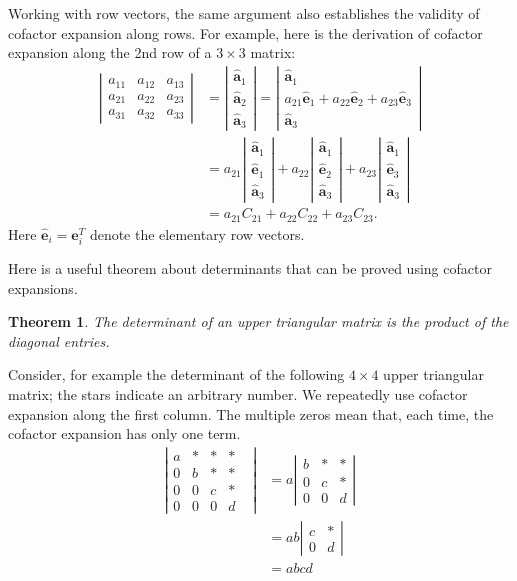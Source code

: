 \documentclass[12pt]{article}
\newcommand{\ha}{\hat{\ba}}
\newcommand{\ba}{\mathbf{a}}
\newcommand{\be}{\mathbf{e}}
\newcommand{\he}{\hat{\be}}
\newcommand{\vmat}[1]{\left|\begin{matrix}#1\end{matrix}\right|}
\newtheorem{theorem}{Theorem}
\begin{document}
Working with row vectors, the same argument also establishes the
validity of cofactor expansion along rows.  For example, here is the
derivation of
cofactor expansion along the 2nd row of a $3\times 3$ matrix:
\begin{align*}
\vmat{ a_{11}&a_{12}& a_{13} \\
    a_{21}&a_{22} & a_{23} \\
    a_{31}&a_{32} & a_{33}}
  &= \vmat{ \ha_1\\ \ha_2\\ \ha_3}  = \vmat{\ha_1\\ a_{21} \he_1+ a_{22}
    \he_2 + a_{23} \he_3 \\ \ha_3}  \\
  &= a_{21} \vmat{\ha_1\\ \he_1\\
    \ha_3} + a_{22} \vmat{\ha_1\\ \he_2\\ \ha_3} +a_{23}
  \vmat{\ha_1\\ \he_3\\ \ha_3} \\
  &= a_{21} C_{21} + a_{22} C_{22} + a_{23} C_{23}.
\end{align*}
Here $\he_i = \be_i^T$ denote the elementary row vectors.

Here is a useful theorem about determinants that can be proved using
cofactor expansions.
\begin{theorem}
The determinant of an upper
   triangular matrix is the product of the diagonal entries.
\end{theorem}
Consider, for example the determinant of the following $4\times 4$
upper triangular matrix; the stars indicate an arbitrary number.  We
repeatedly use cofactor expansion along the first column.  The
multiple zeros mean that, each time, the cofactor expansion has only one term.
\begin{align*}
 \vmat{a&*&*&*\\0&b&*&*&\\0&0&c&*\\ 0&0&0&d} &=
 a \vmat{b&*&*\\0&c&*\\0&0&d} \\
 &= ab \vmat{c&*\\0&d} \\
 &= abcd  
\end{align*}
\end{document}
